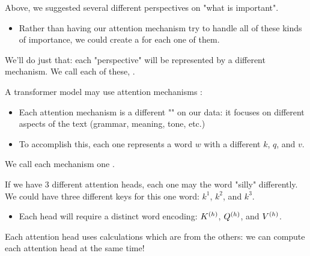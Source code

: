     Above, we suggested several different perspectives on "what is important".

    \begin{itemize}
        \item Rather than having our attention mechanism try to handle all of these kinds of importance, we could create a  for each one of them.
    \end{itemize}

    We'll do just that: each "perspective" will be represented by a different mechanism. We call each of these, .\\

    \begin{definition}
        A transformer model may use  attention mechanisms :

        \begin{itemize}
            \item Each attention mechanism is a different "" on our data: it focuses on different aspects of the text (grammar, meaning, tone, etc.)

            \item To accomplish this, each one represents a word $w$ with a different $k$, $q$, and $v$.
        \end{itemize}

        We call each mechanism one .
    \end{definition}

    If we have 3 different attention heads, each one may  the word "silly" differently. We could have three different keys for this one word: $k^1$, $k^2$, and $k^3$.

    \begin{itemize}
        \item Each head will require a distinct word encoding: $K^{(h)}$, $Q^{(h)}$, and $V^{(h)}$.\\
    \end{itemize}

    \begin{concept}
    
        Each attention head uses calculations which are  from the others: we can compute each attention head at the same time!
    \end{concept}

    

